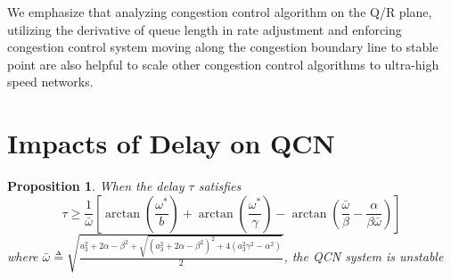 \documentclass{sig-alternate-10pt}
\begin{document}
We emphasize that analyzing congestion control algorithm on the Q/R plane, utilizing the derivative of queue length in rate adjustment and enforcing congestion control system moving along the congestion boundary line to stable point are also helpful to scale other congestion control algorithms to ultra-high speed networks.





  



\appendix
\section{Impacts of Delay on QCN}
\newtheorem{theorem}{Proposition}
\begin{theorem}
When the delay $\tau$ satisfies 
\begin{equation}
\tau\geq \frac{1}{\bar{\omega}}[\arctan(\frac{\omega^*}{b})+\arctan(\frac{\omega^*}{\gamma})-\arctan(\frac{\bar{\omega}}{\beta}-\frac{\alpha}{\beta\bar{\omega}})]
\end{equation}
where $\bar{\omega}\triangleq \sqrt{\frac{a_3^2+2\alpha-\beta^2+\sqrt{(a_3^2+2\alpha-\beta^2)^2+4(a_3^2\gamma^2-\alpha^2)}}{2}}$, 
the QCN system is unstable
\label{Proposition1}
\end{theorem}
\end{document}
